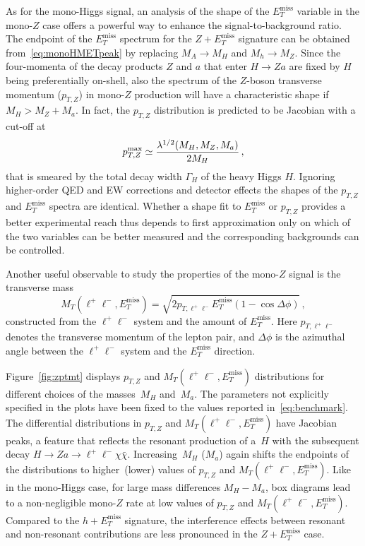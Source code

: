 \documentclass[a4paper, 11pt,notoc]{article}
\newcommand{\MET}{\ensuremath{E_T^\mathrm{miss}}\xspace}
\newcommand{\ma}{\ensuremath{M_{a}}\xspace}
\newcommand{\mH}{\ensuremath{M_{H}}\xspace}
\begin{document}
As for the mono-Higgs signal, an analysis of the shape of the $\MET$ variable in the mono-$Z$ case offers a powerful way to enhance the signal-to-background ratio. The endpoint of the $\MET$ spectrum for the $Z+\MET$ signature can be obtained from~\eqref{eq:monoHMETpeak} by  replacing $M_A \to M_H$ and $M_h \to M_Z$.  Since the four-momenta of the decay products $Z$ and $a$ that enter $H \to Za$ are fixed by $H$ being preferentially on-shell, also the spectrum of the $Z$-boson transverse momentum ($p_{T,Z}$) in mono-$Z$ production will have a characteristic shape if $M_H > M_Z + M_a$.   In fact,  the $p_{T,Z}$ distribution is predicted  to be Jacobian with a cut-off at~\cite{No:2015xqa,Bauer:2017ota}
\begin{equation} \label{eq:monoZpTpeak}
p_{T,Z}^{ {\rm max} } \simeq \frac{\lambda^{1/2}(M_H, M_Z, M_a)}{2 M_H}\,,
\end{equation}
that is smeared by the total decay width $\Gamma_H$ of the heavy Higgs $H$. Ignoring higher-order QED and EW corrections and detector effects the shapes of the $p_{T,Z}$ and $\MET$ spectra are identical. Whether a shape fit to $\MET$ or $p_{T,Z}$ provides a better experimental reach thus depends to first approximation only on which of the two variables can be better measured and the corresponding backgrounds can be controlled.

Another useful observable to study the properties of the mono-$Z$ signal is the transverse mass 
\begin{equation} \label{eq:transversemass}
M_T (\ell^+ \ell^-,\MET) = \sqrt{2 p_{T, \ell^+ \ell^-}  \MET  \left ( 1- \cos \Delta \phi \right )} \,,
\end{equation}
constructed from the $\ell^+ \ell^-$ system and the amount of $\MET$. Here $p_{T, \ell^+ \ell^-}$ denotes the transverse momentum of the lepton pair, and $\Delta \phi$ is the azimuthal angle between the $\ell^+ \ell^-$ system and the $\MET$ direction.

Figure~\ref{fig:zptmt} displays  $p_{T,Z}$ and $M_T(\ell^+ \ell^-, \MET)$ distributions for different choices of the masses~$M_H$ and~$M_a$. The parameters not explicitly specified in the plots have been  fixed to the values reported in~\eqref{eq:benchmark}. The differential distributions in $p_{T,Z}$ and $M_T(\ell^+ \ell^-, \MET)$ have Jacobian peaks, a feature that  reflects the resonant production of a~$H$ with the subsequent decay $H \to Z a \to \ell^+ \ell^- \chi \bar \chi$.  Increasing~$\mH$ ($\ma$) again shifts the endpoints of the distributions to higher~(lower) values of $p_{T,Z}$ and $M_T(\ell^+ \ell^-, \MET)$. Like in the mono-Higgs case, for large mass differences $M_H - M_a$, box diagrams lead to a non-negligible mono-$Z$ rate at low values of $p_{T,Z}$ and $M_T(\ell^+ \ell^-, \MET)$. Compared to the $h + \MET$ signature, the interference effects between resonant and non-resonant contributions  are less pronounced  in  the $Z + \MET$  case. 
\end{document}
